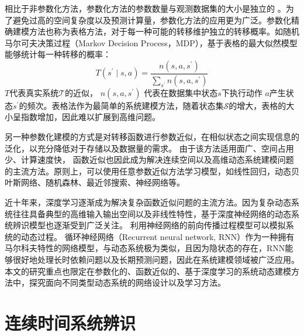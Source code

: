 相比于非参数化方法，参数化方法的参数数量与观测数据集的大小是独立的
。为了避免过高的空间复杂度以及预测计算量，参数化方法的应用更为广泛。参数化精确建模方法也称为表格方法，对于每一种可能的转移维护独立的转移概率。如随机马尔可夫决策过程（Markov Decision Process，MDP），基于表格的最大似然模型能够统计每一种转移的概率：
\begin{equation}
    T\left(s^{\prime} \mid s, a\right)=\frac{n\left(s, a, s^{\prime}\right)}{\sum_{s^{\prime}} n\left(s, a, s^{\prime}\right)}
\end{equation}
$T$代表真实系统$\mathcal{\mathcal { T }}$的近似，
$n\left(s, a, s^{\prime}\right)$ 代表在数据集中状态$s$下执行动作 $a$产生状态$s^{\prime}$的频次。表格法作为最简单的系统建模方法，随着状态集$\mathcal{S}$的增大，表格的大小呈指数增加，因此难以扩展到高维问题。

另一种参数化建模的方式是对转移函数进行参数近似，在相似状态之间实现信息的泛化，以充分降低对于存储以及数据量的需求。
由于该方法适用面广、空间占用少、计算速度快，
函数近似也因此成为解决连续空间以及高维动态系统建模问题的主流方法。原则上，可以使用任意参数近似方法学习模型，如线性回归\cite{silver2008sample}，动态贝叶斯网络、随机森林、最近邻搜索、神经网络\cite{werbos1989neural}等。

近十年来，深度学习逐渐成为解决复杂函数近似问题的主流方法。因为复杂动态系统往往具备典型的高维输入输出空间以及非线性特性，基于深度神经网络的动态系统辨识模型也逐渐受到广泛关注。
利用神经网络的前向传播过程模型可以模拟系统的动态过程\cite{temeng1995model, tan1996nonlinear}。
循环神经网络（Recurrent neural network, RNN）作为一种拥有马尔科夫特性的网络模型，与动态系统极为类似，且因为隐状态的存在，RNN能够很好地处理长时依赖问题以及长期预测问题，因此在系统建模领域被广泛应用\cite{delgado1995dynamic, zamarreno1998state}。
本文的研究重点也限定在参数化的、函数近似的、基于深度学习的系统动态建模方法中，探究面向不同类型动态系统的网络设计以及学习方法。



\section{连续时间系统辨识}

